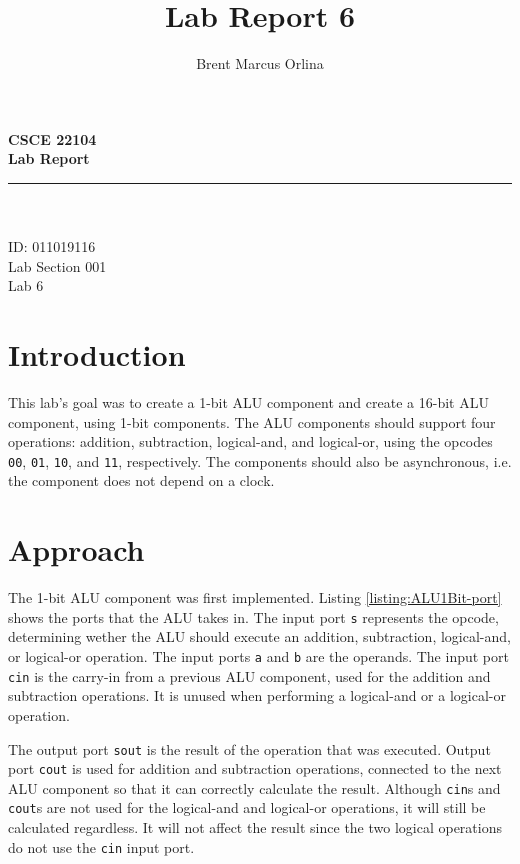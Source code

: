 \documentclass[11pt]{report}
\makeatletter
\newcommand{\@labsection}{000}
\newcommand{\labsection}[1]{
    \renewcommand{\@labsection}{#1}
}
\newcommand{\@labnumber}{0}
\newcommand{\labnumber}[1]{
    \renewcommand{\@labnumber}{#1}
}
\newcommand{\@shortsubmitted}{1/1/70}
\newcommand{\shortsubmitted}[1]{
    \renewcommand{\@shortsubmitted}{#1}
}
\renewcommand{\maketitle}{
    \newgeometry{left=1in, right=1in, top=1.75in, textheight=8.25in}
    \singlespacing
    \begin{center}
        {\huge \bf CSCE 22104} \\
        \vspace{2.5em}
        {\Large \bf Lab Report} \\
        \vspace{2em}
        \noindent\rule{20em}{0.4pt} \\
        \vspace{1em}
        {\Large \@author} \\
        \vspace{.75em}
        {\normalsize ID: 011019116} \\
        \vspace{.75em}
        {\normalsize Lab Section \@labsection} \\
        \vspace{.75em}
        {\normalsize Lab \@labnumber} \\
    \end{center}
    \newpage
    \restoregeometry
}
\makeatother
\begin{document}
\title{Lab Report 6}
\author{Brent Marcus Orlina}

\labsection{001}
\labnumber{6}

\shortsubmitted{3/19/25}

\maketitle

\section*{Introduction}
This lab's goal was to create a 1-bit ALU component and create a 16-bit ALU component, using 1-bit
components. The ALU components should support four operations: addition, subtraction, logical-and,
and logical-or, using the opcodes \verb|00|, \verb|01|, \verb|10|, and \verb|11|, respectively. The
components should also be asynchronous, i.e. the component does not depend on a clock.

\section*{Approach}

The 1-bit ALU component was first implemented. Listing \ref{listing:ALU1Bit-port} shows the ports
that the ALU takes in. The input port \verb|s| represents the opcode, determining wether the ALU
should execute an addition, subtraction, logical-and, or logical-or operation. The input ports
\verb|a| and \verb|b| are the operands. The input port \verb|cin| is the carry-in from a previous
ALU component, used for the addition and subtraction operations. It is unused when performing a
logical-and or a logical-or operation.

The output port \verb|sout| is the result of the operation that was executed. Output port
\verb|cout| is used for addition and subtraction operations, connected to the next ALU component so
that it can correctly calculate the result. Although \verb|cin|s and \verb|cout|s are not used for
the logical-and and logical-or operations, it will still be calculated regardless. It will not
affect the result since the two logical operations do not use the \verb|cin| input port.
\end{document}
